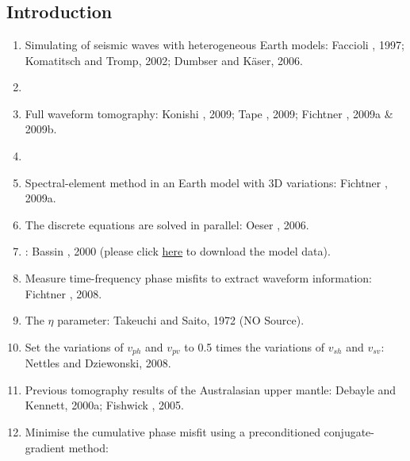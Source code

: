 \renewcommand{\pmk}{Fichtner\_2010\_EPSL\_Full waveform tomography}
\renewcommand{\prf}{FWI/\pmk.pdf}
\renewcommand{\pti}{Full waveform tomography for radially anisotropic structure:
New insights into present and past states of the Australasian upper mantle}
\renewcommand{\pay}{Andreas Fichtner, Brian L. N. Kennett and Heiner Igel \etal, 2010}
\renewcommand{\pjo}{Earth and Planetary Science Letters}
\renewcommand{\pda}{2016/10/13 Thu.}

\section{\pinfo}
\subsection{Introduction}
\begin{enumerate}[\hspace{10mm}*]
  \item Simulating of seismic waves with heterogeneous Earth models: Faccioli \etal, 1997;
    Komatitsch and Tromp, 2002; Dumbser and K\"{a}ser, 2006.
  \item \sline
  \item Full waveform tomography: Konishi \etal, 2009; Tape \etal, 2009;
    Fichtner \etal, 2009a \& 2009b.
  \item \sline
  \item Spectral-element method in an Earth model with 3D variations: Fichtner \etal, 2009a.
  \item The discrete equations are solved in parallel: Oeser \etal, 2006.
  \item {}
    :
    Bassin \etal, 2000 (please click \href{http://igppweb.ucsd.edu/~gabi/crust2.html}{here}
    to download the model data).
  \item Measure time-frequency phase misfits to extract waveform information: Fichtner \etal, 2008.
  \item The $\eta$ parameter: Takeuchi and Saito, 1972 (NO Source).
  \item Set the variations of $v_{ph}$ and $v_{pv}$ to 0.5 times
    the variations of $v_{sh}$ and $v_{sv}$: Nettles and Dziewonski, 2008.
  \item Previous tomography results of the Australasian upper mantle:
    Debayle and Kennett, 2000a; Fishwick \etal, 2005.
  \item Minimise the cumulative phase misfit using a preconditioned conjugate-gradient method:

\end{enumerate}
